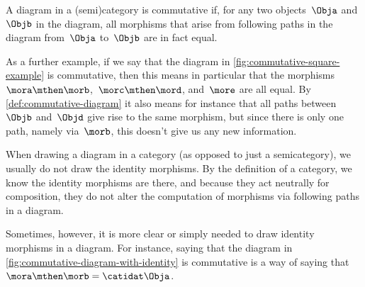 \begin{marginfigure}
    \centering
    \caption{}
    \label{fig:commutative-diagram-example-prep}
\end{marginfigure}

\begin{marginfigure}
    \centering
    \caption{}
    \label{fig:commutative-diagram-example}
\end{marginfigure}

\begin{marginfigure}
    \centering
    \caption{}
    \label{fig:commutative-square-example}
\end{marginfigure}

\begin{marginfigure}
    \centering
    \caption{}
    \label{fig:commutative-diagram-with-identity}
\end{marginfigure}

\begin{definition}
    \label{def:commutative-diagram}
    A diagram in a (semi)category is commutative if, for any two objects~$\Obja$ and~$\Objb$ in the diagram, all morphisms that arise from following paths in the diagram from~$\Obja$ to~$\Objb$ are in fact equal.
\end{definition}

As a further example, if we say that the diagram in \cref{fig:commutative-square-example} is commutative, then this means in particular that the morphisms~$\mora \mthen \morb$,~$\morc \mthen \mord$, and~$\more$ are all equal.
By \cref{def:commutative-diagram} it also means for instance that all paths between~$\Objb$ and~$\Objd$ give rise to the same morphism, but since there is only one path, namely via~$\morb$, this doesn't give us any new information.

\begin{remark}
    When drawing a diagram in a category (as opposed to just a semicategory), we usually do not draw the identity morphisms.
    By the definition of a category, we know the identity morphisms are there, and because they act neutrally for composition, they do not alter the computation of morphisms via following paths in a diagram.

    Sometimes, however, it is more clear or simply needed to draw identity morphisms in a diagram.
    For instance, saying that the diagram in \cref{fig:commutative-diagram-with-identity} is commutative is a way of saying that~$\mora \mthen \morb = \catidat\Obja$.
\end{remark}

